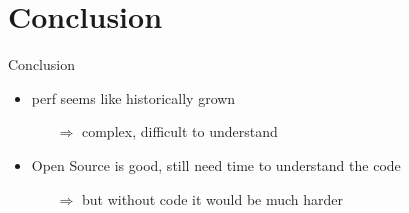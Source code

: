 \section{Conclusion}
\begin{frame}{Conclusion}
\begin{itemize}
  \item perf seems like historically grown
  \begin{itemize}
    \item[$\Rightarrow$] complex, difficult to understand
  \end{itemize}
\pause
  \item Open Source is good, still need time to understand the code
  \begin{itemize}
    \item[$\Rightarrow$] but without code it would be much harder
  \end{itemize}
\end{itemize}
\end{frame}




